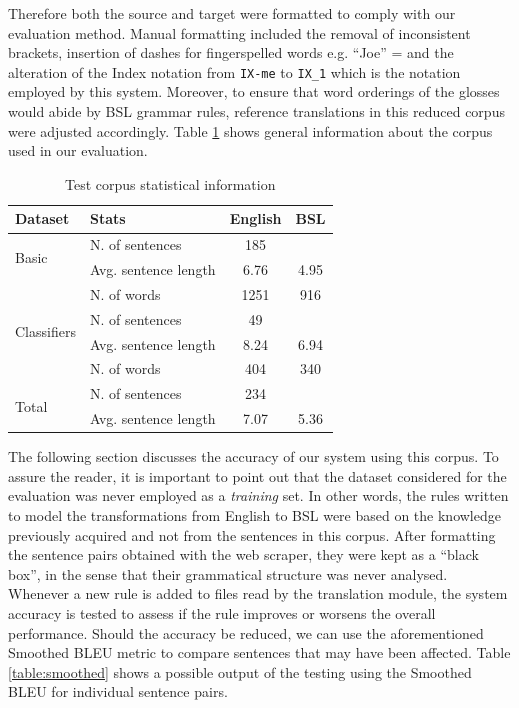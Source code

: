 \documentclass[12pt]{ociamthesis}  %
\begin{document}
Therefore both the source and target were formatted to comply with our evaluation method. Manual formatting included the removal of inconsistent brackets, insertion of dashes for fingerspelled words e.g. ``Joe'' =  and the alteration of the Index notation from \texttt{IX-me} to \texttt{IX\_1} which is the notation employed by this system. Moreover, to ensure that word orderings of the glosses would abide by BSL grammar rules, reference translations in this reduced corpus were adjusted accordingly. Table \ref{table:corpus} shows general information about the corpus used in our evaluation.
\begin{table}[H]
\center
\begin{tabular}{llcc}
\hline
Dataset & Stats & English & BSL \\
\hline
\multirow{ 2}{*}{Basic} & N. of sentences & 185 &\\
& Avg. sentence length & 6.76 & 4.95 \\
& N. of words & 1251 & 916 \\
\hline
\multirow{ 2}{*}{Classifiers} & N. of sentences & 49 &\\
& Avg. sentence length & 8.24 & 6.94 \\
& N. of words & 404 & 340 \\
\hline
\multirow{ 2}{*}{Total} & N. of sentences & 234 &\\
& Avg. sentence length & 7.07 & 5.36 \\
\hline
\end{tabular}
\caption{Test corpus statistical information}
\label{table:corpus}
\end{table}
The following section discusses the accuracy of our system using this corpus. To assure the reader, it is important to point out that the dataset considered for the evaluation was never employed as a \textit{training} set. In other words, the rules written to model the transformations from English to BSL were based on the knowledge previously acquired and not from the sentences in this corpus. After formatting the sentence pairs obtained with the web scraper, they were kept as a ``black box'', in the sense that their grammatical structure was never analysed. Whenever a new rule is added to files read by the translation module, the system accuracy is tested to assess if the rule improves or worsens the overall performance. Should the accuracy be reduced, we can use the aforementioned Smoothed BLEU    metric to compare sentences that may have been affected. Table \ref{table:smoothed} shows a possible output of the testing using the Smoothed BLEU for individual sentence pairs.
\end{document}
